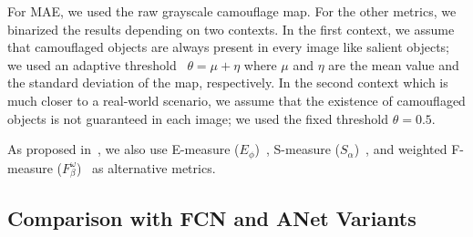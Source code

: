 \documentclass[journal]{IEEEtran}
\begin{document}
For MAE, we used the raw grayscale camouflage map. For the other metrics, we binarized the results depending on two contexts. In the first context, we assume that camouflaged objects are always present in every image like salient objects; we used an adaptive threshold~\cite{Jia-ICCV2013} $\theta=\mu+\eta$ where $\mu$ and $\eta$ are the mean value and the standard deviation of the map, respectively. In the second context which is much closer to a real-world scenario, we assume that the existence of camouflaged objects is not guaranteed in each image; we used the fixed threshold $\theta=0.5$.

As proposed in~\cite{sinet}, we also use E-measure ($E_{\phi}$)~\cite{ephi},  S-measure ($S_{\alpha}$)~\cite{smeasure}, and weighted F-measure ($F_{\beta}^{\omega}$)~\cite{weightedf} as alternative metrics.


\subsection{Comparison with FCN and ANet Variants} 
\end{document}
